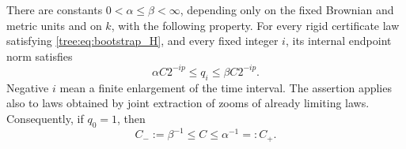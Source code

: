 \begin{proposition}
\label{tree:prop:internal_norm_comparison}
There are constants $0<\alpha\leq\beta<\infty$, depending only on
the fixed Brownian and metric units and on $k$, with the following
property.  For every rigid certificate law satisfying
\eqref{tree:eq:bootstrap_H}, and every fixed integer $i$, its internal
endpoint norm satisfies
\begin{equation}
 \alpha C2^{-ip}\leq q_i\leq\beta C2^{-ip}.
 \label{tree:eq:bootstrap_norm_bridge}
\end{equation}
Negative $i$ mean a finite enlargement of the time interval.  The
assertion applies also to laws obtained by joint extraction of zooms
of already limiting laws.  Consequently, if $q_0=1$, then
\begin{equation}
 C_-:=\beta^{-1}\leq C\leq\alpha^{-1}=:C_+.
 \label{tree:eq:bootstrap_C_range}
\end{equation}
\end{proposition}

